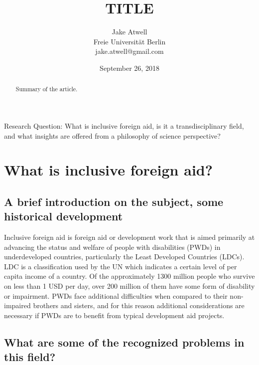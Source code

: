 \documentclass[a4paper]{article}
\begin{document}
\title{TITLE}
\author{Jake Atwell\\Freie Universität Berlin\\jake.atwell@gmail.com}
\date{September 26, 2018}

\maketitle
\newpage

Research Question: What is inclusive foreign aid, is it a transdisciplinary field, and what
insights are offered from a philosophy of science perspective?

\tableofcontents



\begin{abstract}
Summary of the article.
\end{abstract}
\newpage




\section{What is inclusive foreign aid?}

\subsection{A brief introduction on the subject, some historical development}

Inclusive foreign aid is foreign aid or development work that is aimed
primarily at advancing the status and welfare of people with disabilities
(PWDs) in underdeveloped countries, particularly the Least Developed Countries
(LDCs). LDC is a classification used by the UN which indicates a certain level
of per capita income of a country. Of the approximately 1300 million people
who survive on less than 1 USD per day, over 200 million of them have some
form of disability or impairment. PWDs face additional difficulties when
compared to their non-impaired brothers and sisters, and for this reason
additional considerations are necessary if PWDs are to benefit from typical
development aid projects. 


\subsection{What are some of the recognized problems in this field?}
\end{document}
